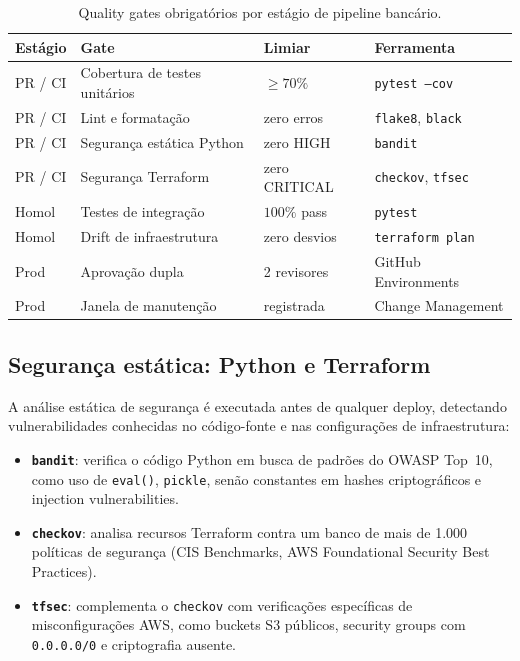 \begin{table}[ht]
  \centering
  \caption{Quality gates obrigat\'orios por est\'agio de pipeline banc\'ario.}
  \label{tab:quality_gates}
  \begin{tabular}{llll}
    \toprule
    Est\'agio & Gate & Limiar & Ferramenta \\
    \midrule
    PR / CI   & Cobertura de testes unit\'arios & $\geq 70\%$  & \texttt{pytest --cov} \\
    PR / CI   & Lint e formata\c{c}\~ao         & zero erros   & \texttt{flake8}, \texttt{black} \\
    PR / CI   & Seguran\c{c}a est\'atica Python  & zero HIGH    & \texttt{bandit} \\
    PR / CI   & Seguran\c{c}a Terraform          & zero CRITICAL & \texttt{checkov}, \texttt{tfsec} \\
    Homol     & Testes de integra\c{c}\~ao       & $100\%$ pass & \texttt{pytest} \\
    Homol     & Drift de infraestrutura          & zero desvios & \texttt{terraform plan} \\
    Prod      & Aprova\c{c}\~ao dupla            & 2 revisores  & GitHub Environments \\
    Prod      & Janela de manuten\c{c}\~ao        & registrada   & Change Management \\
    \bottomrule
  \end{tabular}
\end{table}

\subsection{Segurança estática: Python e Terraform}

A an\'alise est\'atica de seguran\c{c}a
\'e executada antes de qualquer deploy, detectando vulnerabilidades conhecidas
no c\'odigo-fonte e nas configura\c{c}\~oes de infraestrutura:

\begin{itemize}[leftmargin=*]
  \item \textbf{\texttt{bandit}}:
        verifica o c\'odigo Python em busca de padr\~oes do OWASP Top~10,
        como uso de \texttt{eval()}, \texttt{pickle}, sen\~ao constantes
        em hashes criptogr\'aficos e injection vulnerabilities.
  \item \textbf{\texttt{checkov}}:
        analisa recursos Terraform contra um banco de mais de 1.000
        pol\'iticas de seguran\c{c}a (CIS Benchmarks, AWS Foundational
        Security Best Practices).
  \item \textbf{\texttt{tfsec}}:
        complementa o \texttt{checkov} com verifica\c{c}\~oes espec\'ificas
        de misconfigura\c{c}\~oes AWS, como buckets S3 p\'ublicos,
        security groups com \texttt{0.0.0.0/0} e criptografia ausente.
\end{itemize}

